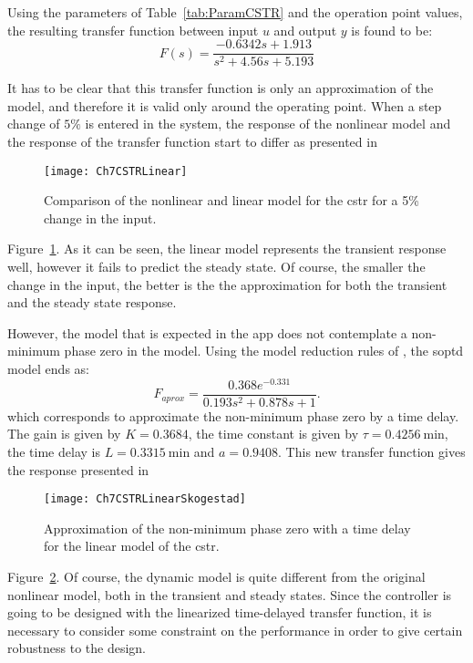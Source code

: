 Using the parameters of Table~\ref{tab:ParamCSTR} and the operation point values, the resulting transfer function between input $u$ and output $y$ is found to be:
\begin{equation}
	F(s) = \frac{-0.6342 s + 1.913}{s^2 + 4.56 s + 5.193}
	\label{eq:TFCSTR}
\end{equation}

It has to be clear that this transfer function is only an approximation of the model, and therefore it is valid only around the operating point. When a step change of $5\%$ is entered in the system, the response of the nonlinear model and the response of the transfer function start to differ as presented in %
%
\begin{figure}[tb]
	\centering
	\texttt{[image: Ch7CSTRLinear]}
	\caption{Comparison of the nonlinear and linear model for the \gls{cstr} for a 5\% change in the input.}
	\label{fig:Ch7CSTRLinear}
\end{figure}
%
Figure~\ref{fig:Ch7CSTRLinear}. As it can be seen, the linear model represents the transient response well, however it fails to predict the steady state. Of course, the smaller the change in the input, the better is the the approximation for both the transient and the steady state response.

However, the model that is expected in the \matlab{} app does not contemplate a non-minimum phase zero in the model. Using the model reduction rules of \citet{Skogestad2003}, the \gls{soptd} model ends as:
\begin{equation}
	F_{aprox} = \frac{0.368 e^{-0.331}}{0.193 s^2 + 0.878 s +1}.
	\label{eq:Faprox}
\end{equation}
which corresponds to approximate the non-minimum phase zero by a time delay. The gain is given by $K=0.3684$, the time constant is given by $\tau= \SI{0.4256}{\minute}$, the time delay is $L= \SI{0.3315}{\minute}$ and $a = 0.9408$. This new transfer function gives the response presented in %
\begin{figure}[tb]
	\centering
	\texttt{[image: Ch7CSTRLinearSkogestad]}
	\caption{Approximation of the non-minimum phase zero with a time delay for the linear model of the \gls{cstr}.}
	\label{fig:Ch7CSTRLinearSkogestad}
\end{figure}
%
Figure~\ref{fig:Ch7CSTRLinearSkogestad}. Of course, the dynamic model is quite different from the original nonlinear model, both in the transient and steady states. Since the controller is going to be designed with the linearized time-delayed transfer function, it is necessary to consider some constraint on the performance in order to give certain robustness to the design.

